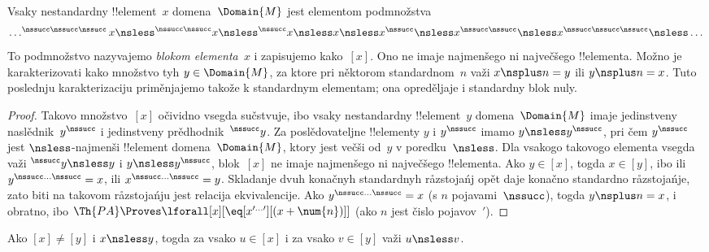 \documentclass[../../../include/open-logic-section]{subfiles}
\begin{document}
\begin{prop}
Vsaky nestandardny !!{element}~$x$ domena~$\Domain{M}$ jest elementom
podmnožstva
\[
\dots ^{\nssucc\nssucc\nssucc}x \nsless ^{\nssucc\nssucc}x \nsless
^{\nssucc}x \nsless x \nsless x^{\nssucc} \nsless x^{\nssucc\nssucc}
\nsless x^{\nssucc\nssucc\nssucc} \nsless \dots
\]
To podmnožstvo nazyvajemo \emph{blokom elementa~$x$} i zapisujemo
kako~$[x]$. Ono ne imaje najmenšego ni največšego !!{element}a. Možno
je karakterizovati kako množstvo tyh $y \in \Domain{M}$, za ktore pri
něktorom standardnom~$n$ važi $x \nsplus n = y$ ili $y \nsplus n = x$.
Tuto poslednju karakterizaciju priměnjajemo takože k standardnym
elementam; ona opreděljaje i standardny blok nuly.
\end{prop}

\begin{proof}
Takovo množstvo~$[x]$ očividno vsegda sučstvuje, ibo vsaky nestandardny
!!{element}~$y$ domena~$\Domain{M}$ imaje jedinstveny
naslědnik~$y^\nssucc$ i jedinstveny prědhodnik~$^\nssucc y$. Za
poslědovateljne !!{element}y $y$ i $y^\nssucc$ imamo $y \nsless
y^\nssucc$, pri čem $y^\nssucc$ jest $\nsless$-najmenši !!{element}
domena~$\Domain{M}$, ktory jest večši od~$y$ v poredku~$\nsless$.
Dla vsakogo takovogo elementa
vsegda važi $^\nssucc y \nsless y$ i $y \nsless y^\nssucc$, blok~$[x]$
ne imaje najmenšego ni največšego !!{element}a. Ako $y \in [x]$, togda
$x \in [y]$, ibo ili $y^{\nssucc\dots\nssucc} = x$, ili
$x^{\nssucc\dots\nssucc} = y$. Skladanje dvuh konačnyh standardnyh
råzstojańj opět daje konačno standardno råzstojańje, zato biti na
takovom råzstojańju jest relacija ekvivalencije. Ako
$y^{\nssucc\dots\nssucc} = x$ (s $n$ pojavami~$\nssucc$), togda
$y \nsplus n = x$, i obratno, ibo
$\Th{PA} \Proves \lforall[x][\eq[x^{\prime\dots\prime}][(x +
    \num{n})]]$ (ako $n$ jest čislo pojavov~$\prime$).
\end{proof}

\begin{prop}
Ako $[x] \neq [y]$ i $x \nsless y$, togda za vsako $u \in [x]$ i
za vsako $v \in [y]$ važi $u \nsless v$.
\end{prop}
\end{document}
